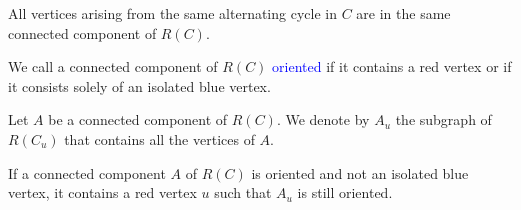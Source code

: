 \documentclass{beamer}
\theoremstyle{definition}
\def\spadding{\vspace{0.25cm}}
\def\b{\textcolor{blue}}
\begin{document}
\begin{frame}

\begin{lemma}
\label{lem:3}
All vertices arising from the same alternating cycle in $C$ are in the same connected component of $R(C)$.
\end{lemma}\pause

\begin{definition}
We call a connected component of $R(C)$ \b{oriented} if it contains a red vertex or if it consists solely of an isolated blue vertex. \pause\spadding

Let $A$ be a connected component of $R(C)$. We denote by $A_u$ the subgraph of $R(C_u)$ that contains all the vertices of $A$.
\end{definition}\pause

\begin{lemma}
\label{lem:4}
If a connected component $A$ of $R(C)$ is oriented and not an isolated blue vertex, it contains a red vertex $u$ such that $A_u$ is still oriented.
\end{lemma}


\end{frame}
\end{document}
